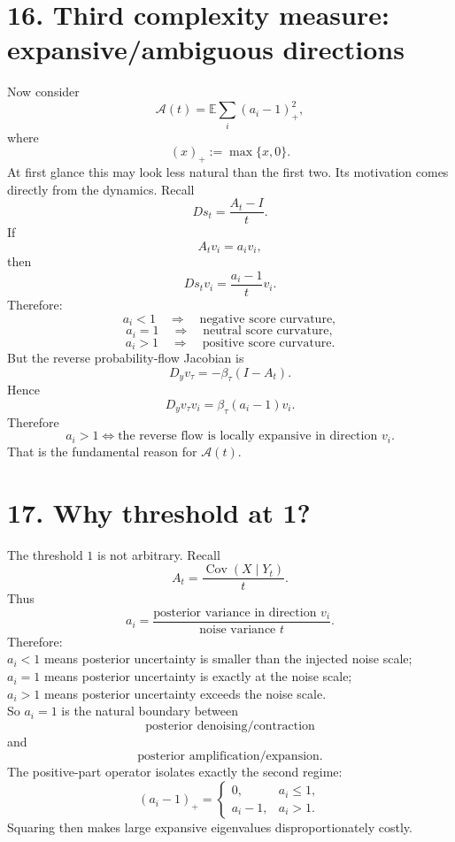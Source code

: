 \documentclass{article}
\begin{document}
\section*{16. Third complexity measure: expansive/ambiguous directions}
Now consider
\[
\boxed{
\mathcal A(t) = \mathbb E \sum_i(a_i-1)_+^2,
}
\]
where
\[
(x)_+ := \max\{x,0\}.
\]
At first glance this may look less natural than the first two. Its motivation comes directly from the dynamics.
Recall
\[
Ds_t = \frac{A_t-I}{t}.
\]
If
\[
A_t v_i = a_i v_i,
\]
then
\[
Ds_t v_i = \frac{a_i-1}{t}v_i.
\]
Therefore:
\[
a_i < 1 \quad\Rightarrow\quad \text{negative score curvature},
\]
\[
a_i = 1 \quad\Rightarrow\quad \text{neutral score curvature},
\]
\[
a_i > 1 \quad\Rightarrow\quad \text{positive score curvature}.
\]
But the reverse probability-flow Jacobian is
\[
D_y v_\tau = -\beta_\tau(I-A_t).
\]
Hence
\[
D_y v_\tau v_i = \beta_\tau(a_i-1)v_i.
\]
Therefore
\[
\boxed{
a_i > 1 \iff \text{the reverse flow is locally expansive in direction }v_i.
}
\]
That is the fundamental reason for $\mathcal A(t)$.

\section*{17. Why threshold at 1?}
The threshold $1$ is not arbitrary.
Recall
\[
A_t = \frac{\operatorname{Cov}(X\mid Y_t)}{t}.
\]
Thus
\[
a_i = \frac{\text{posterior variance in direction }v_i}{\text{noise variance }t}.
\]
Therefore: \\
$a_i < 1$ means posterior uncertainty is smaller than the injected noise scale; \\
$a_i = 1$ means posterior uncertainty is exactly at the noise scale; \\
$a_i > 1$ means posterior uncertainty exceeds the noise scale. \\
So $a_i = 1$ is the natural boundary between
\[
\text{posterior denoising/contraction}
\]
and
\[
\text{posterior amplification/expansion}.
\]
The positive-part operator isolates exactly the second regime:
\[
(a_i-1)_+ =
\begin{cases}
0,& a_i\le1,\\[1ex]
a_i-1,& a_i>1.
\end{cases}
\]
Squaring then makes large expansive eigenvalues disproportionately costly.
\end{document}

